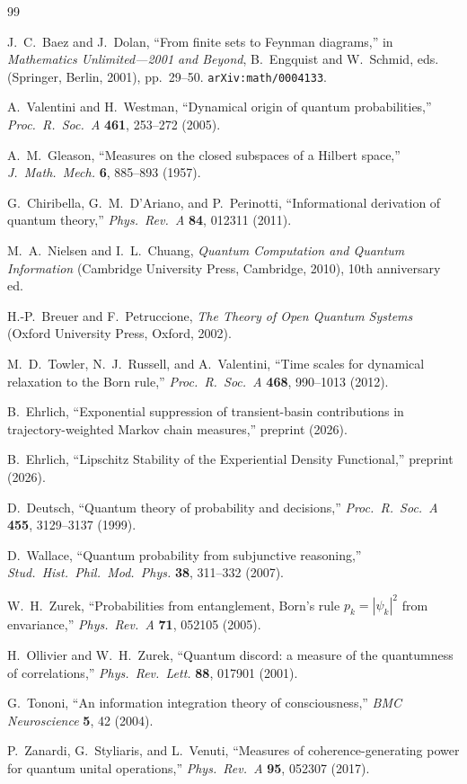 \documentclass[12pt,a4paper]{article}
\begin{document}
\begin{thebibliography}{99}

J.~C.~Baez and J.~Dolan,
``From finite sets to Feynman diagrams,''
in \textit{Mathematics Unlimited---2001 and Beyond},
B.~Engquist and W.~Schmid, eds.
(Springer, Berlin, 2001), pp.~29--50.
\texttt{arXiv:math/0004133}.

A.~Valentini and H.~Westman,
``Dynamical origin of quantum probabilities,''
\textit{Proc.\ R.\ Soc.\ A} \textbf{461}, 253--272 (2005).

A.~M.~Gleason,
``Measures on the closed subspaces of a Hilbert space,''
\textit{J.\ Math.\ Mech.} \textbf{6}, 885--893 (1957).

G.~Chiribella, G.~M.~D'Ariano, and P.~Perinotti,
``Informational derivation of quantum theory,''
\textit{Phys.\ Rev.\ A} \textbf{84}, 012311 (2011).

M.~A.~Nielsen and I.~L.~Chuang,
\textit{Quantum Computation and Quantum Information}
(Cambridge University Press, Cambridge, 2010), 10th anniversary ed.

H.-P.~Breuer and F.~Petruccione,
\textit{The Theory of Open Quantum Systems}
(Oxford University Press, Oxford, 2002).

M.~D.~Towler, N.~J.~Russell, and A.~Valentini,
``Time scales for dynamical relaxation to the Born rule,''
\textit{Proc.\ R.\ Soc.\ A} \textbf{468}, 990--1013 (2012).

B.~Ehrlich,
``Exponential suppression of transient-basin contributions in
trajectory-weighted Markov chain measures,''
preprint (2026).

B.~Ehrlich,
``Lipschitz Stability of the Experiential Density Functional,''
preprint (2026).

D.~Deutsch,
``Quantum theory of probability and decisions,''
\textit{Proc.\ R.\ Soc.\ A} \textbf{455}, 3129--3137 (1999).

D.~Wallace,
``Quantum probability from subjunctive reasoning,''
\textit{Stud.\ Hist.\ Phil.\ Mod.\ Phys.} \textbf{38}, 311--332 (2007).

W.~H.~Zurek,
``Probabilities from entanglement, Born's rule $p_k = |\psi_k|^2$
from envariance,''
\textit{Phys.\ Rev.\ A} \textbf{71}, 052105 (2005).

H.~Ollivier and W.~H.~Zurek,
``Quantum discord: a measure of the quantumness of correlations,''
\textit{Phys.\ Rev.\ Lett.} \textbf{88}, 017901 (2001).

G.~Tononi,
``An information integration theory of consciousness,''
\textit{BMC Neuroscience} \textbf{5}, 42 (2004).

P.~Zanardi, G.~Styliaris, and L.~Venuti,
``Measures of coherence-generating power for quantum unital
operations,''
\textit{Phys.\ Rev.\ A} \textbf{95}, 052307 (2017).

\end{thebibliography}
\end{document}
